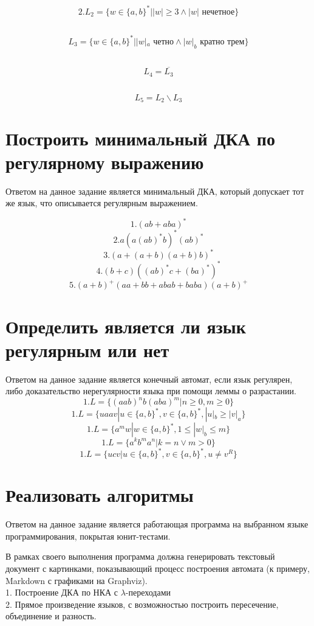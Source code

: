 \documentclass[a4paper, 12pt]{article}
\begin{document}
\subsection{}
$$2. L_2 = \{ w \in \{a,b\}^* | |w| \geq 3 \land |w| \text{ нечетное} \}$$

\subsection{}
$$L_3 = \{ w \in \{a,b\}^* | |w|_a \text{ четно} \land |w|_b \text{ кратно трем} \}$$

\subsection{}
$$L_4 = \overline{L_3}$$

\subsection{}
$$L_5 = L_2 \backslash L_3$$

\section{Построить минимальный ДКА по регулярному выражению}
Ответом на данное задание является минимальный ДКА, который допускает тот же язык, что описывается регулярным выражением.

$$1. (ab + aba)^*$$
$$2. a(a(ab)^*b)^*(ab)^*$$
$$3. (a + (a + b)(a + b)b)^*$$
$$4. (b + c)((ab)^*c + (ba)^*)^*$$
$$5. (a + b)^+(aa + bb + abab + baba)(a + b)^+$$


\section{Определить является ли язык регулярным или нет}
Ответом на данное задание является конечный автомат, если язык регулярен, либо доказательство нерегулярности языка при помощи леммы о разрастании.
$$1. L = \{(aab)^nb(aba)^m | n \geq 0, m \geq 0\}$$
$$1. L = \{uaav | u \in \{a,b\}^*, v \in \{a,b\}^*, |u|_b \geq |v|_a\}$$
$$1. L = \{a^mw | w \in \{a, b\}^*, 1 \leq |w|_b \leq m  \}$$
$$1. L = \{ a^kb^ma^n | k = n \lor m > 0\}$$
$$1. L = \{ ucv | u \in \{a,b\}^*, v \in \{a,b\}^*, u \neq v^R \}$$

\section{Реализовать алгоритмы}
Ответом на данное задание является работающая программа на выбранном языке программирования, покрытая юнит-тестами.

В рамках своего выполнения программа должна генерировать текстовый документ с картинками, показывающий процесс построения автомата (к примеру, Markdown с графиками на Graphviz).\\
1. Построение ДКА по НКА с $\lambda$-переходами \\
2. Прямое произведение языков, с возможностью построить пересечение, объединение и разность.
\end{document}
